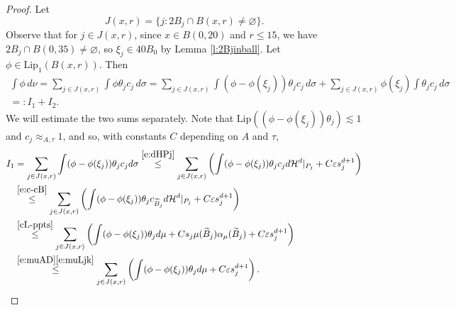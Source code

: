 \documentclass[11pt]{amsart}
\newcommand{\ve}{{\varepsilon}}
\newcommand{\wt}[1]{{\widetilde{#1}}}
\theoremstyle{definition}
\theoremstyle{remark}
\numberwithin{equation}{section}
\def\cH{{\mathcal{H}}}
\newcommand{\ps}[1]{\left( #1 \right)}
\def\lec{\lesssim}
\def\lec{\lesssim}
\def\Lip{\textrm{Lip}}
\begin{document}
\begin{proof}
Let 
\[
J(x,r) = \{j: 2B_{j}\cap B(x,r)\neq\varnothing\}.
\]
Observe that for $j\in J(x,r)$,  since $x\in B(0,20)$ and $r\leq15$, we have $2B_{j}\cap B(0,35)\neq\varnothing$, so $\xi_{j}\in 40 B_{0}$ by Lemma \ref{l:2Bjinball}. Let $\phi\in \Lip_{1}(B(x,r))$. Then
\begin{multline*}
\int \phi\, d\nu 
=\sum_{j\in J(x,r)} \int \phi \theta_{j} c_{j}\,d\sigma 
=\sum_{j\in J(x,r)}\int (\phi-\phi(\xi_{j})) \theta_{j}c_{j}\,d\sigma +\sum_{j\in J(x,r)}\!\! \phi(\xi_{j}) \int  \theta_{j}c_{j}\,d\sigma \\
=:I_{1}+I_{2}.
\end{multline*}
We will estimate the two sums separately. Note that $\Lip((\phi-\phi(\xi_{j})) \theta_{j})\lec 1$
and $c_j\approx_{A,\tau}1$, and so, with constants $C$ depending on $A$ and $\tau$,
\begin{align*}
I_{1} 
& = \sum_{j\in J(x,r)}\int (\phi-\phi(\xi_{j})) \theta_{j}c_{j}d\sigma
 \stackrel{\eqref{e:dHPj}}{\leq}  \sum_{j\in J(x,r)}\ps{\int (\phi-\phi(\xi_{j})) \theta_{j}c_{j}d \cH^{d}|_{P_{j}}+C\ve s_{j}^{d+1}}\\
 & \stackrel{\eqref{e:c-cB}}{\leq} \sum_{j\in J(x,r)}\ps{\int (\phi-\phi(\xi_{j})) \theta_{j}c_{\wt{B}_{j}}d \cH^{d}|_{P_{j}}+C\ve s_{j}^{d+1}}\\
& \stackrel{\eqref{cL-ppts}}{\leq} \sum_{j\in J(x,r)}\ps{\int (\phi-\phi(\xi_{j})) \theta_{j}d\mu + Cs_{j}\mu(\wt{B}_{j}) \alpha_{\mu}(\wt{B}_{j}) +C\ve s_{j}^{d+1}}\\
& \stackrel{\eqref{e:muAD}\eqref{e:muLjk}}{\leq} \sum_{j\in J(x,r)}\ps{\int (\phi-\phi(\xi_{j})) \theta_{j}d\mu + C\ve s_{j}^{d+1}}.\\
\end{align*}




\end{proof}
\end{document}
